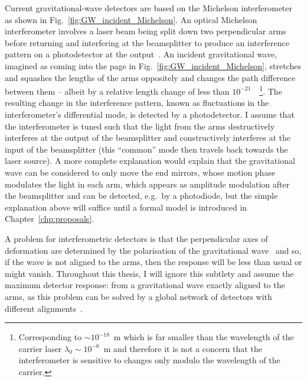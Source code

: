 Current gravitational-wave detectors are based on the Michelson interferometer as shown in Fig.~\ref{fig:GW_incident_Michelson}. An optical Michelson interferometer involves a laser beam being split down two perpendicular arms before returning and interfering at the beamsplitter to produce an interference pattern on a photodetector at the output~\cite{}. 
An incident gravitational wave, imagined as coming into the page in Fig.~\ref{fig:GW_incident_Michelson}, stretches and squashes the lengths of the arms oppositely and changes the path difference between them -- albeit by a relative length change of less than $10^{-21}$~\cite{}~\footnote{Corresponding to $\sim10^{-18}$~m which is far smaller than the wavelength of the carrier laser $\lambda_0\sim10^{-6}$~m and therefore it is not a concern that the interferometer is sensitive to changes only modulo the wavelength of the carrier.}. The resulting change in the interference pattern, known as fluctuations in the interferometer's differential mode, is detected by a photodetector. I assume that the interferometer is tuned such that the light from the arms destructively interferes at the output of the beamsplitter and constructively interferes at the input of the beamsplitter (this ``common'' mode then travels back towards the laser source).
A more complete explanation would explain that  the gravitational wave can be considered to only move the end mirrors, whose motion phase modulates the light in each arm, which appears as amplitude modulation after the beamsplitter and can be detected, e.g.\ by a photodiode, but the simple explanation above will suffice until a formal model is introduced in Chapter~\ref{chp:proposals}.  


A problem for interferometric detectors is that the perpendicular axes of deformation are determined by the polarisation of the gravitational wave~\cite{} and so, if the wave is not aligned to the arms, then the response will be less than usual or might vanish. Throughout this thesis, I will ignore this subtlety and assume the maximum detector response: from a gravitational wave exactly aligned to the arms, as this problem can be solved by a global network of detectors with different alignments~\cite{}. %

